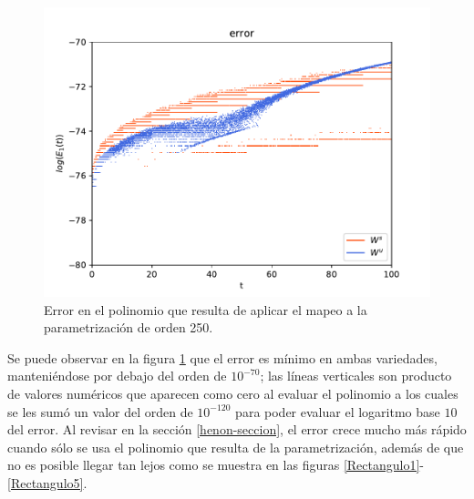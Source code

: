 \begin{figure}[h!]
\centering
\includegraphics[scale=0.7]{error1ite.pdf}
\caption{Error en el polinomio que resulta de aplicar el mapeo a la parametrización de orden 250.}
\label{error-1iteracion}
\end{figure}
Se puede observar en la figura \ref{error-1iteracion} que el error es mínimo en ambas variedades, manteniéndose por debajo del orden de $10^{-70}$; las líneas verticales son producto de valores numéricos que aparecen como cero al evaluar el polinomio a los cuales se les sumó un valor del orden de $10^{-120}$ para poder evaluar el logaritmo base $10$ del error. Al revisar en la sección \ref{henon-seccion}, el error crece mucho más rápido cuando sólo se usa el polinomio que resulta de la parametrización, además de que no es posible llegar tan lejos como se muestra en las figuras \ref{Rectangulo1}-\ref{Rectangulo5}.\\

